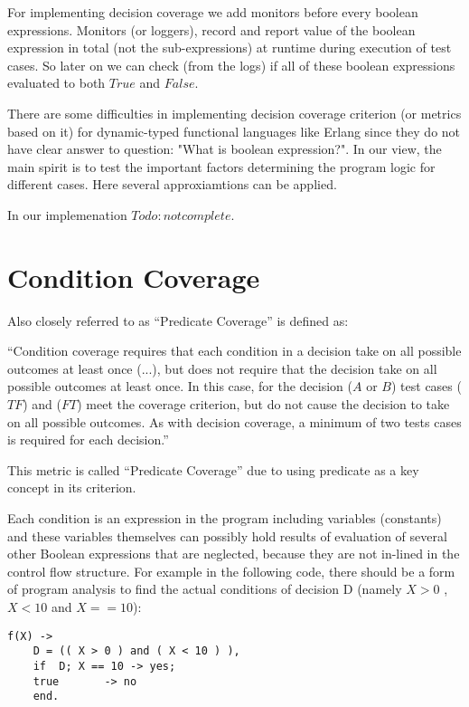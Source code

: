\documentclass[12pt,a4paper]{report}
\begin{document}
For implementing decision coverage we add monitors before every boolean expressions. Monitors (or loggers), record and report value of the boolean
 expression in total (not the sub-expressions) at runtime during execution of test cases. So later on we can check (from the logs) if all of these
 boolean expressions evaluated to both $True$ and $False$.

There are some difficulties in implementing decision coverage criterion (or metrics based on it) for dynamic-typed functional languages like Erlang since
 they do not have clear answer to question: "What is boolean expression?". In our view, the main spirit is to test the important factors determining the
 program logic for different cases. Here several approxiamtions can be applied. 

In our implemenation $Todo: not complete$.  
 
\section{Condition Coverage}
Also closely referred to as “Predicate Coverage” is defined as:

“Condition coverage requires that each condition in a decision take on all possible outcomes at least once (...), but does not require that the decision
 take on all possible outcomes at least once. In this case, for the decision ($A$ or $B$) test cases ($TF$) and ($FT$) meet the coverage criterion, but do
 not cause the decision to take on all possible outcomes. As with decision coverage, a minimum of two tests cases is required for each decision.”
\cite{KellyJ.:2001:PTM:886632}

This metric is called “Predicate Coverage” due to using predicate as a key concept in its criterion.

Each condition is an expression in the program including variables (constants) and these variables themselves can possibly hold results of evaluation of
 several other Boolean expressions that are neglected, because they are not in-lined in the control flow structure. For example in the following code, there
 should be a form of program analysis to find the actual conditions of decision D (namely $X>0$ , $X<10$ and $X==10$):

\begin{lstlisting}
f(X) -> 
    D = (( X > 0 ) and ( X < 10 ) ),
    if	D; X == 10 -> yes;
	true       -> no
    end.  
\end{lstlisting}
\end{document}
